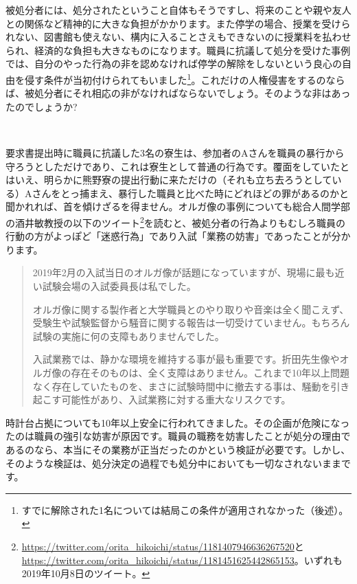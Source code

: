 被処分者には、処分されたということ自体もそうですし、将来のことや親や友人との関係など精神的に大きな負担がかかります。また停学の場合、授業を受けられない、図書館も使えない、構内に入ることさえもできないのに授業料を払わせられ、経済的な負担も大きなものになります。職員に抗議して処分を受けた事例では、自分のやった行為の非を認めなければ停学の解除をしないという良心の自由を侵す条件が当初付けられてもいました\footnote{すでに解除された1名については結局この条件が適用されなかった（後述）。}。これだけの人権侵害をするのならば、被処分者にそれ相応の非がなければならないでしょう。そのような非はあったのでしょうか?

\vspace{4mm}
\noindent{}\ \ 

要求書提出時に職員に抗議した3名の寮生は、参加者のAさんを職員の暴行から守ろうとしただけであり、これは寮生として普通の行為です。覆面をしていたとはいえ、明らかに熊野寮の提出行動に来ただけの（それも立ち去ろうとしている）Aさんをとっ捕まえ、暴行した職員と比べた時にどれほどの罪があるのかと聞かれれば、首を傾けざるを得ません。オルガ像の事例についても総合人間学部の酒井敏教授の以下のツイート\footnote{\url{https://twitter.com/orita_hikoichi/status/1181407946636267520}と\url{https://twitter.com/orita_hikoichi/status/1181451625442865153}。いずれも2019年10月8日のツイート。}を読むと、被処分者の行為よりもむしろ職員の行動の方がよっぽど「迷惑行為」であり入試「業務の妨害」であったことが分かります。

\begin{quotation}
    2019年2月の入試当日のオルガ像が話題になっていますが、現場に最も近い試験会場の入試委員長は私でした。

    オルガ像に関する製作者と大学職員とのやり取りや音楽は全く聞こえず、受験生や試験監督から騒音に関する報告は一切受けていません。もちろん試験の実施に何の支障もありませんでした。

    入試業務では、静かな環境を維持する事が最も重要です。折田先生像やオルガ像の存在そのものは、全く支障はありません。これまで10年以上問題なく存在していたものを、まさに試験時間中に撤去する事は、騒動を引き起こす可能性があり、入試業務に対する重大なリスクです。
\end{quotation}

時計台占拠についても10年以上安全に行われてきました。その企画が危険になったのは職員の強引な妨害が原因です。職員の職務を妨害したことが処分の理由であるのなら、本当にその業務が正当だったのかという検証が必要です。しかし、そのような検証は、処分決定の過程でも処分中においても一切なされないままです。

